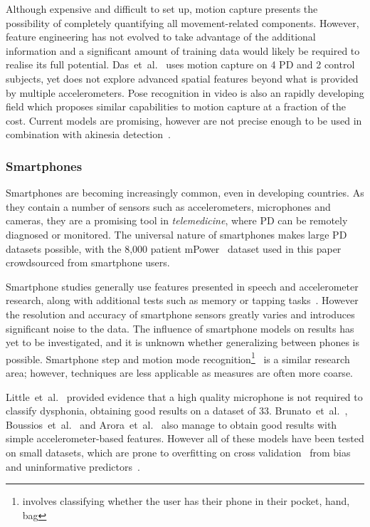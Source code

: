\documentclass[12pt, twoside]{book}
\renewcommand\emph[1]{\textit{\color{USred}{#1}}}
\begin{document}
Although expensive and difficult to set up, motion capture presents the possibility of completely quantifying all movement-related components. However, feature engineering has not evolved to take advantage of the additional information and a significant amount of training data would likely be required to realise its full potential. Das~et~al.~\cite{das2011quantitative} uses motion capture on 4 PD and 2 control subjects, yet does not explore advanced spatial features beyond what is provided by multiple accelerometers. Pose recognition in video is also an rapidly developing field which proposes similar capabilities to motion capture at a fraction of the cost. Current models are promising, however are not precise enough to be used in combination with akinesia detection~\cite{toyer2017human}.

\subsubsection{Smartphones}
Smartphones are becoming increasingly common, even in developing countries. As they contain a number of sensors such as accelerometers, microphones and cameras, they are a promising tool in \textit{telemedicine}, where PD can be remotely diagnosed or monitored. The universal nature of smartphones makes large PD datasets possible, with the 8,000 patient mPower~\cite{mpower} dataset used in this paper crowdsourced from smartphone users.

Smartphone studies generally use features presented in speech and accelerometer research, along with additional tests such as memory or tapping tasks~\cite{tapping}. However the resolution and accuracy of smartphone sensors greatly varies and introduces significant noise to the data. The influence of smartphone models on results has yet to be investigated, and it is unknown whether generalizing between phones is possible. Smartphone step and motion mode recognition\footnote{\emph{Motion mode recognition} involves classifying whether the user has their phone in their pocket, hand, bag  }~\cite{motionmoderecognition, li2010multimodal} is a similar research area; however, techniques are less applicable as measures are often more coarse.


Little~et~al.~\cite{splittledysphonia2009} provided evidence that a high quality microphone is not required to classify dysphonia, obtaining good results on a dataset of 33. Brunato~et~al.~\cite{smartphonemjfoxlion}, Boussios~et~al.~\cite{smartphonemjfoxB} and Arora~et~al.~\cite{arora2014high} also manage to obtain good results with simple accelerometer-based features. However all of these models have been tested on small datasets, which are prone to overfitting on cross validation~\cite{overfittingcv} from bias and uninformative predictors~\cite{freedmanparadox}. 
\end{document}
